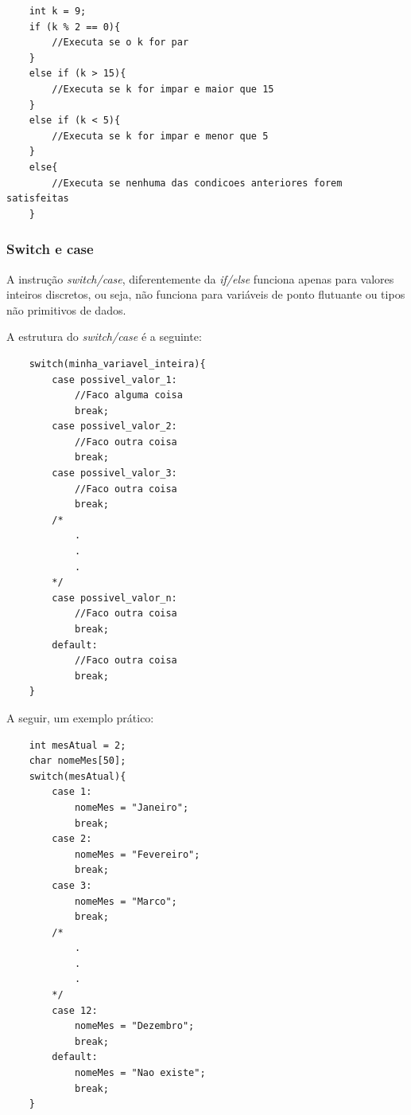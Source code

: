 \documentclass[12pt]{article}
\newcommand\tab[1][1cm]{\hspace*{#1}}
\begin{document}
\hspace{0.25cm}
\begin{lstlisting}
    int k = 9;
    if (k % 2 == 0){
        //Executa se o k for par
    }
    else if (k > 15){
        //Executa se k for impar e maior que 15
    }
    else if (k < 5){
        //Executa se k for impar e menor que 5
    }
    else{
        //Executa se nenhuma das condicoes anteriores forem satisfeitas
    }
\end{lstlisting}

\subsubsection{Switch e case}

\par\tab A instrução \textit{switch/case}, diferentemente da \textit{if/else} funciona apenas para valores inteiros discretos, ou seja, não funciona para variáveis de ponto flutuante ou tipos não primitivos de dados.

\par\tab A estrutura do \textit{switch/case} é a seguinte:

\hspace{0.25cm}
\begin{lstlisting}
    switch(minha_variavel_inteira){
        case possivel_valor_1:
            //Faco alguma coisa
            break;
        case possivel_valor_2:
            //Faco outra coisa
            break;
        case possivel_valor_3:
            //Faco outra coisa
            break;
        /*
            .
            .
            .
        */
        case possivel_valor_n:
            //Faco outra coisa
            break;
        default:
            //Faco outra coisa
            break;
    }
\end{lstlisting}

\par\tab A seguir, um exemplo prático:

\hspace{0.25cm}
\begin{lstlisting}
    int mesAtual = 2;
    char nomeMes[50];
    switch(mesAtual){
        case 1:
            nomeMes = "Janeiro";
            break;
        case 2:
            nomeMes = "Fevereiro";
            break;
        case 3:
            nomeMes = "Marco";
            break;
        /*
            .
            .
            .
        */
        case 12:
            nomeMes = "Dezembro";
            break;
        default:
            nomeMes = "Nao existe";
            break;
    }
\end{lstlisting}
\end{document}
